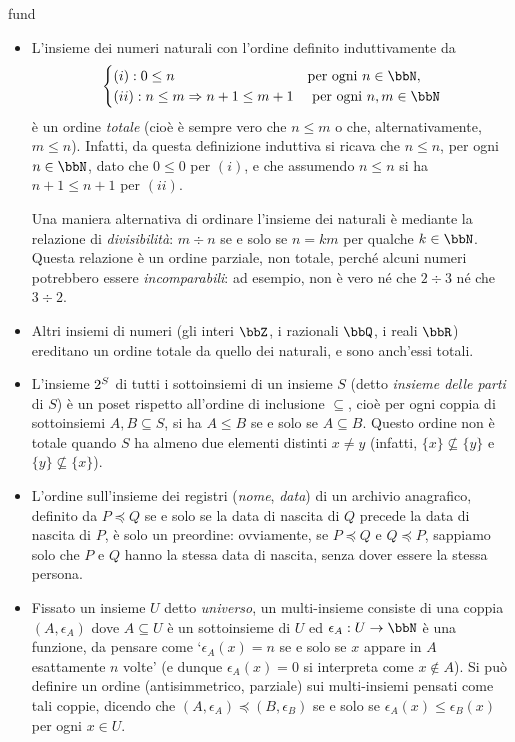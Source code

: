 \begin{hExamples}{fund}\leavevmode
	\begin{itemize}
		\item L'insieme dei numeri naturali con l'ordine definito induttivamente da
		      \[\begin{cases}
				      (i): 0\le n                         & \text{per ogni } n\in\bbN,   \\
				      (ii): n\le m \Rightarrow n+1\le m+1 & \text{ per ogni } n,m\in\bbN
			      \end{cases}\]
		      è un ordine \emph{totale} (cioè è sempre vero che \(n\le m\) o che, alternativamente, \(m\le n\)). Infatti, da questa definizione induttiva si ricava che \(n\le n\), per ogni	\(n\in\bbN\), dato che \(0\le 0\) per \((i)\), e che assumendo \(n\le n\) si ha \(n+1\le n+1\) per \((ii)\).

		      Una maniera alternativa di ordinare l'insieme dei naturali è mediante la relazione di \emph{divisibilità}: \(m\div n\) se e solo se \(n = km\) per qualche \(k\in\bbN\). Questa relazione è un ordine parziale, non totale, perché alcuni numeri potrebbero essere \emph{incomparabili}: ad esempio, non è vero né che \(2\div 3\) né che \(3\div 2\).
		\item Altri insiemi di numeri (gli interi \(\bbZ\), i razionali \(\bbQ\), i reali \(\bbR\)) ereditano un ordine totale	da quello dei naturali, e sono anch'essi totali.
		\item L'insieme \(2^{S}\) di tutti i sottoinsiemi di un insieme \(S\) (detto \emph{insieme  delle parti} di \(S\)) è un poset rispetto all'ordine di inclusione \(\subseteq\), cioè per ogni coppia di sottoinsiemi \(A,B\subseteq S\), si ha \(A\le B\) se e solo se \(A\subseteq B\). Questo ordine non è totale quando \(S\) ha almeno due elementi distinti \(x\ne y\) (infatti, \(\{x\}\not\subseteq\{y\}\) e \(\{y\}\not\subseteq\{x\}\)).
		\item L'ordine sull'insieme dei registri (\emph{nome}, \emph{data}) di un archivio anagrafico, definito da \(P\preceq Q\) se e solo se la data di nascita di \(Q\) precede la data di nascita di \(P\), è solo un preordine: ovviamente, se \(P\preceq Q\) e \(Q\preceq P\), sappiamo solo che \(P\) e \(Q\) hanno la stessa data di nascita, senza dover essere la stessa persona.
		\item Fissato un insieme \(U\) detto \emph{universo}, un multi-insieme consiste di una coppia \((A,\epsilon_A)\) dove \(A\subseteq U\) è un sottoinsieme di \(U\) ed \(\epsilon_A : U \to \bbN\) è una funzione, da pensare come `\(\epsilon_A(x)=n\) se e solo se \(x\) appare in \(A\) esattamente \(n\) volte' (e dunque \(\epsilon_A(x)=0\) si interpreta come \(x\notin A\)). Si può definire un ordine (antisimmetrico, parziale) sui multi-insiemi pensati come tali coppie, dicendo che \((A,\epsilon_A)\preceq (B,\epsilon_B)\) se e solo se \(\epsilon_A(x)\le \epsilon_B(x)\) per ogni \(x\in U\).
	\end{itemize}
\end{hExamples}
